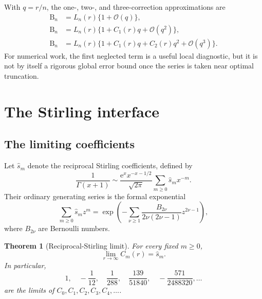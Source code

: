 \documentclass[11pt,a4paper]{article}
\newtheorem{theorem}{Theorem}[section]
\theoremstyle{definition}
\newcommand{\Bell}{\mathrm B}
\newcommand{\ee}{\mathrm e}
\newcommand{\bigO}{\mathcal O}
\begin{document}
\begin{resultbox}[title=First practical truncations,fonttitle=\bfseries]
With $q=r/n$, the one-, two-, and three-correction approximations are
\begin{align*}
 \Bell_n&=L_n(r)\{1+\bigO(q)\},\\
 \Bell_n&=L_n(r)\{1+C_1(r)q+\bigO(q^2)\},\\
 \Bell_n&=L_n(r)\{1+C_1(r)q+C_2(r)q^2+\bigO(q^3)\}.
\end{align*}
For numerical work, the first neglected term is a useful local diagnostic, but
it is not by itself a rigorous global error bound once the series is taken near
optimal truncation.
\end{resultbox}

\section{The Stirling interface}

\subsection{The limiting coefficients}

Let $\widehat s_m$ denote the reciprocal Stirling coefficients, defined by
\begin{equation}\label{eq:reciprocal-stirling}
 \frac1{\Gamma(x+1)}
 \sim\frac{\ee^x x^{-x-1/2}}{\sqrt{2\pi}}
 \sum_{m\ge0}\widehat s_m x^{-m}.
\end{equation}
Their ordinary generating series is the formal exponential
\begin{equation}\label{eq:reciprocal-stirling-gen}
 \sum_{m\ge0}\widehat s_m z^m
 =\exp\!\left(
 -\sum_{\nu\ge1}
 \frac{B_{2\nu}}{2\nu(2\nu-1)}z^{2\nu-1}
 \right),
\end{equation}
where $B_{2\nu}$ are Bernoulli numbers.

\begin{theorem}[Reciprocal-Stirling limit]\label{thm:stirling-limit}
For every fixed $m\ge0$,
\begin{equation}\label{eq:C-limit}
 \lim_{r\to\infty}C_m(r)=\widehat s_m.
\end{equation}
In particular,
\begin{equation}\label{eq:C-limits-list}
 1,\quad -\frac1{12},\quad \frac1{288},\quad
 \frac{139}{51840},\quad -\frac{571}{2488320},\ldots
\end{equation}
are the limits of $C_0,C_1,C_2,C_3,C_4,\ldots$.
\end{theorem}
\end{document}
